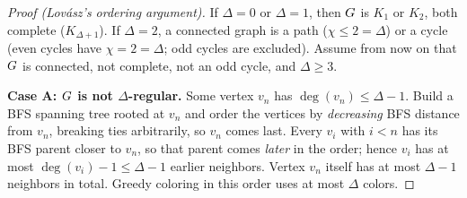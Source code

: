 \begin{proof}[Proof (Lov\'asz's ordering argument)]
If $\Delta=0$ or $\Delta=1$, then $G$ is $K_1$ or $K_2$, both complete ($K_{\Delta+1}$). If $\Delta=2$, a connected graph is a path ($\chi\le 2=\Delta$) or a cycle (even cycles have $\chi=2=\Delta$; odd cycles are excluded). Assume from now on that $G$ is connected, not complete, not an odd cycle, and $\Delta\ge 3$.

\textbf{Case A: $G$ is not $\Delta$-regular.} Some vertex $v_n$ has $\deg(v_n)\le\Delta-1$. Build a BFS spanning tree rooted at $v_n$ and order the vertices by
\emph{decreasing} BFS distance from $v_n$, breaking ties arbitrarily, so $v_n$ comes last. Every
$v_i$ with $i<n$ has its BFS parent closer to $v_n$, so that parent comes \emph{later} in the order; hence $v_i$ has at most
$\deg(v_i)-1\le\Delta-1$ earlier neighbors. Vertex $v_n$ itself has at most $\Delta-1$ neighbors in total. Greedy coloring in this
order uses at most $\Delta$ colors.


\end{proof}
